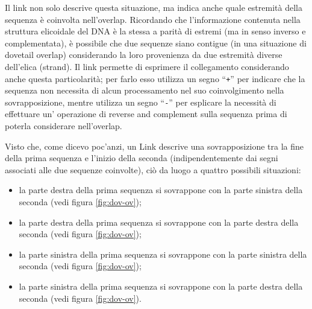Il link non solo descrive questa situazione, ma indica anche quale
estremità della sequenza è coinvolta nell'overlap. Ricordando che
l'informazione contenuta nella struttura elicoidale del DNA è la stessa a parità
di estremi (ma in senso inverso e complementata), è possibile
che due sequenze siano contigue (in una situazione di dovetail
overlap) considerando la loro provenienza da due estremità
diverse dell'elica (strand).
Il link permette di esprimere il collegamento considerando anche questa
particolarità; per farlo esso utilizza un segno ``\texttt{+}'' per indicare
che la sequenza non necessita di alcun processamento nel suo
coinvolgimento nella sovrapposizione, mentre utilizza un segno ``\texttt{-}''
per esplicare la necessità di effettuare un' operazione di reverse
and complement sulla sequenza prima di poterla considerare
nell'overlap.

Visto che, come dicevo poc'anzi, un Link descrive una sovrapposizione
tra la fine della prima sequenza e l'inizio della seconda (indipendentemente
dai segni associati alle due sequenze coinvolte), ciò da luogo a quattro
possibili situazioni:
\begin{itemize}
	\item la parte destra della prima sequenza si sovrappone con la parte
		sinistra della seconda (vedi figura \ref{fig:dov-ov});
	\item la parte destra della prima sequenza si sovrappone con la parte
		destra della seconda (vedi figura \ref{fig:dov-ov});
	\item la parte sinistra della prima sequenza si sovrappone con la parte
		sinistra della seconda (vedi figura \ref{fig:dov-ov});
	\item la parte sinistra della prima sequenza si sovrappone con la parte
		destra della seconda (vedi figura \ref{fig:dov-ov}).
\end{itemize}

